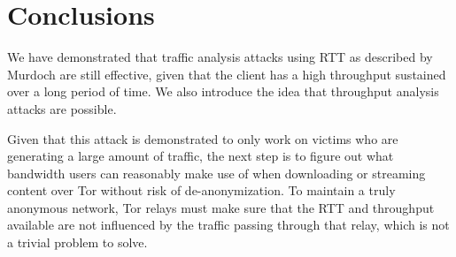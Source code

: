 \documentclass[12pt,journal]{IEEEtran}
\begin{document}
\section{Conclusions}
We have demonstrated that traffic analysis attacks using RTT as described by Murdoch are still effective, given that the client has a high throughput sustained over a long period of time. We also introduce the idea that throughput analysis attacks are possible.
\par
Given that this attack is demonstrated to only work on victims who are generating a large amount of traffic, the next step is to figure out what bandwidth users can reasonably make use of when downloading or streaming content over Tor without risk of de-anonymization. To maintain a truly anonymous network, Tor relays must make sure that the RTT and throughput available are not influenced by the traffic passing through that relay, which is not a trivial problem to solve.
\printbibliography
\end{document}
